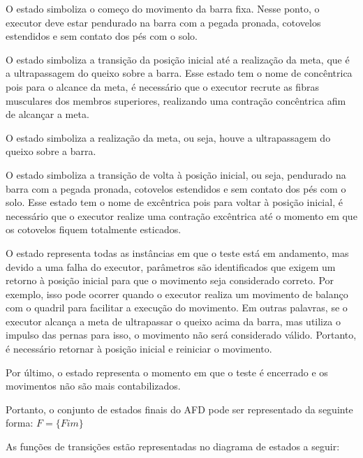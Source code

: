 O estado  simboliza o começo do movimento da barra fixa. Nesse ponto, o executor deve estar pendurado na barra com a pegada pronada, cotovelos estendidos e sem contato dos pés com o solo.

O estado  simboliza a transição da posição inicial até a realização da meta, que é a ultrapassagem do queixo sobre a barra. Esse estado tem o nome de concêntrica pois para o alcance da meta, é necessário que o executor recrute as fibras musculares dos membros superiores, realizando uma contração concêntrica afim de alcançar a meta.

O estado  simboliza a realização da meta, ou seja, houve a ultrapassagem do queixo sobre a barra.

O estado  simboliza a transição de volta à posição inicial, ou seja, pendurado na barra com a pegada pronada, cotovelos estendidos e sem contato dos pés com o solo. Esse estado tem o nome de excêntrica pois para voltar à posição inicial, é necessário que o executor realize uma contração excêntrica até o momento em que os cotovelos fiquem totalmente esticados.

O estado  representa todas as instâncias em que o teste está em andamento, mas devido a uma falha do executor, parâmetros são identificados que exigem um retorno à posição inicial para que o movimento seja considerado correto. Por exemplo, isso pode ocorrer quando o executor realiza um movimento de balanço com o quadril para facilitar a execução do movimento. Em outras palavras, se o executor alcança a meta de ultrapassar o queixo acima da barra, mas utiliza o impulso das pernas para isso, o movimento não será considerado válido. Portanto, é necessário retornar à posição inicial e reiniciar o movimento. 

Por último, o estado  representa o momento em que o teste é encerrado e os movimentos não são mais contabilizados.

Portanto, o conjunto de estados finais do \ac{AFD} pode ser representado da seguinte forma: $F=\{Fim\}$

As funções de transições estão representadas no diagrama de estados a seguir:

